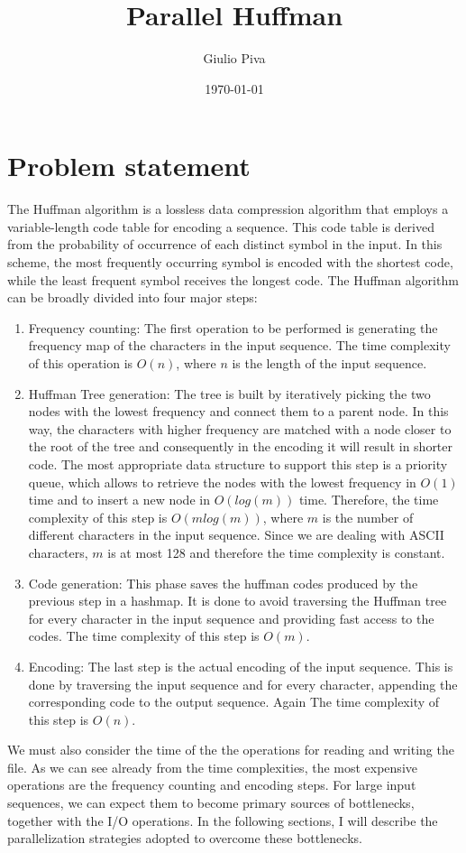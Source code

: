 \documentclass{article}
\title{Parallel Huffman}
\author{Giulio Piva}
\date{\today}
\begin{document}
\maketitle

\tableofcontents
\break
\section{Problem statement}
The Huffman algorithm is a lossless data compression algorithm that employs a variable-length
code table for encoding a sequence. This code table is derived from the probability of
occurrence of each distinct symbol in the input. In this scheme, the most frequently
occurring symbol is encoded with the shortest code, while the least frequent symbol receives the
longest code. The Huffman algorithm can be broadly divided into four major steps:
\begin{enumerate}
    \item Frequency counting: The first operation to be performed is generating the frequency map of the characters in the input sequence.
          The time complexity of this operation is $O(n)$, where $n$ is the length of the input sequence.
    \item Huffman Tree generation: The tree is built by iteratively picking the two nodes with the lowest frequency and connect them to a parent node.
          In this way, the characters with higher frequency are matched with a node closer to the root of the tree and consequently
          in the encoding it will result in shorter code. The most appropriate data structure to
          support this step is a priority queue, which allows to retrieve the nodes with the lowest
          frequency in $O(1)$ time and to insert a new node in $O(log(m))$ time.
          Therefore, the time complexity of this step is $O(mlog(m))$, where $m$ is the number of different characters in the input sequence. Since
          we are dealing with ASCII characters, $m$ is at most 128 and therefore the time complexity is constant.
    \item Code generation: This phase saves the huffman codes produced by the previous step in a hashmap. It
          is done to avoid traversing the Huffman tree for every character in the input sequence and providing fast access to the codes.
          The time complexity of this step is $O(m)$.
    \item Encoding: The last step is the actual encoding of the input sequence. This is done by traversing the input sequence and
          for every character, appending the corresponding code to the output sequence. Again The time complexity of this step is $O(n)$.
\end{enumerate}
We must also consider the time of the the operations for reading and writing the file.
As we can see already from the time complexities, the most expensive operations are the frequency counting and encoding steps.
For large input sequences, we can expect them to become primary sources of bottlenecks, together with the I/O operations.
In the following sections, I will describe the parallelization strategies adopted to overcome these bottlenecks.
\end{document}
